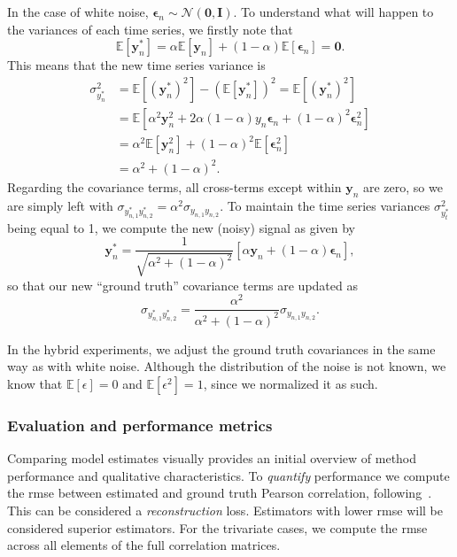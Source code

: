 In the case of white noise, $\mathbf{\epsilon}_n \sim \mathcal{N}(\mathbf{0}, \mathbf{I})$.
To understand what will happen to the variances of each time series, we firstly note that
\begin{equation}
  \mathbb{E}[\mathbf{y}_n^*] = \alpha \mathbb{E}[\mathbf{y}_n] + (1-\alpha)\mathbb{E}[\mathbf{\epsilon}_n] = \mathbf{0}.
\end{equation}
This means that the new time series variance is
\begin{equation}
  \begin{split}
    \sigma_{y_n^*}^2 & = \mathbb{E}[(\mathbf{y}_n^*)^2] - (\mathbb{E}[\mathbf{y}_n^*])^2 = \mathbb{E}[(\mathbf{y}_n^*)^2] \\
    & = \mathbb{E}[\alpha^2 \mathbf{y}_n^2 + 2\alpha(1-\alpha)y_n\mathbf{\epsilon}_n + (1-\alpha)^2\mathbf{\epsilon}_n^2] \\
    & = \alpha^2\mathbb{E}[\mathbf{y}_n^2] + (1-\alpha)^2\mathbb{E}[\mathbf{\epsilon}_n^2] \\
    & = \alpha^2 + (1-\alpha)^2.
  \end{split}
\end{equation}
Regarding the covariance terms, all cross-terms except within $\mathbf{y}_n$ are zero, so we are simply left with $\sigma_{y_{n,1}^*y_{n,2}^*} = \alpha^2\sigma_{y_{n,1}y_{n,2}}$.
To maintain the time series variances $\sigma_{y_t^*}^2$ being equal to 1, we compute the new (noisy) signal as given by
\begin{equation}
  \mathbf{y}_n^* = \frac{1}{\sqrt{\alpha^2 + (1-\alpha)^2}} [\alpha \mathbf{y}_n + (1 - \alpha) \mathbf{\epsilon}_n],
\end{equation}
so that our new ``ground truth'' covariance terms are updated as
\begin{equation}
  \sigma_{y_{n,1}^*y_{n,2}^*} = \frac{\alpha^2}{\alpha^2 + (1-\alpha)^2} \sigma_{y_{n,1}y_{n,2}}.
\end{equation}

In the hybrid experiments, we adjust the ground truth covariances in the same way as with white noise.
Although the distribution of the noise is not known, we know that $\mathbb{E}[\epsilon] = 0$ and $\mathbb{E}[\epsilon^2] = 1$, since we normalized it as such.

\subsubsection{Evaluation and performance metrics}

Comparing model estimates visually provides an initial overview of method performance and qualitative characteristics.
To \emph{quantify} performance we compute the \gls{rmse} between estimated and ground truth Pearson correlation, following~\textcite{Wilson2010, Lindquist2014}.
This can be considered a \emph{reconstruction} loss.
Estimators with lower \gls{rmse} will be considered superior estimators.
For the trivariate cases, we compute the \gls{rmse} across all elements of the full correlation matrices.

